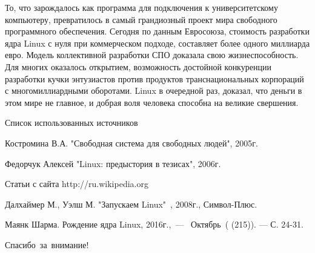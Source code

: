 \documentclass[14pt]{beamer}
\begin{document}
\begin{frame}[shrink=10]
\begin{block}

То, что зарождалось как программа для подключения к 
университетскому компьютеру, превратилось в самый 
грандиозный проект мира свободного программного 
обеспечения. Сегодня по данным Евросоюза, стоимость 
разработки ядра Linux с нуля при коммерческом 
подходе, составляет более одного миллиарда евро. 
Модель коллективной разработки СПО доказала свою 
жизнеспособность. Для многих оказалось открытием, 
возможность достойной конкуренции разработки кучки 
энтузиастов против продуктов транснациональных 
корпораций с многомиллиардными оборотами. Linux в 
очередной раз, доказал, что деньги в этом мире не 
главное, и добрая воля человека способна на великие 
свершения.

\end{block}
\end{frame}

\begin{frame}[shrink=10]
\begin{block}{Список использованных источников}
\begin{thebibliography}{99}
	 Костромина В.А. "Свободная 
	система для свободных 
	людей", 2005г.
	
	 Федорчук Алексей "Linux: 
	предыстория в тезисах", 
	2006г.
	
	 Статьи с сайта
	http://ru.wikipedia.org
	
	 Далхаймер М., Уэлш М. 
	"Запускаем Linux" \,, 2008г., 
	Символ-Плюс.
	
	 Маянк Шарма. Рождение ядра 
	Linux, 2016г.,~—
	~Октябрь~( (215)). — С. 24-31.
\end{thebibliography}
\end{block}
\end{frame}

\begin{frame}[plain]
\vfill
\centering
\begin{Huge}
Спасибо~за~внимание!
\end{Huge}
\vfill

\end{frame}
\end{document}
